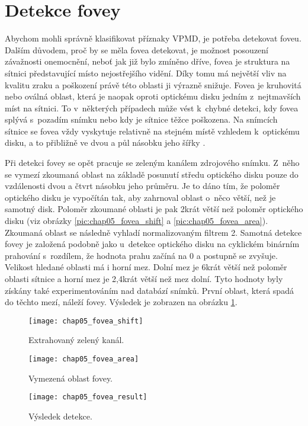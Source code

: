 \section{Detekce fovey}
Abychom mohli správně klasifikovat příznaky VPMD, je potřeba detekovat foveu. Dalším důvodem, proč by se měla fovea detekovat, je možnost posouzení závažnosti onemocnění, neboť jak již bylo zmíněno dříve, fovea je struktura na sítnici představující místo nejostřejšího vidění. Díky tomu má největší vliv na kvalitu zraku a poškození právě této oblasti ji výrazně snižuje. Fovea je kruhovitá nebo oválná oblast, která je naopak oproti optickému disku jedním z~nejtmavších míst na sítnici. To v~některých případech může vést k~chybné detekci, kdy fovea splývá s~pozadím snímku nebo kdy je sítnice těžce poškozena. Na snímcích sítnice se fovea vždy vyskytuje relativně na stejném místě vzhledem k~optickému disku, a to přibližně ve dvou a půl násobku jeho šířky \cite{optic_disc}.

Při detekci fovey se opět pracuje se zeleným kanálem zdrojového snímku. Z~něho se vymezí zkoumaná oblast na základě posunutí středu optického disku pouze do vzdálenosti dvou a čtvrt násobku jeho průměru. Je to dáno tím, že poloměr optického disku je vypočítán tak, aby zahrnoval oblast o~něco větší, než je samotný disk. Poloměr zkoumané oblasti je pak 2krát větší než poloměr optického disku (viz obrázky \ref{pic:chap05_fovea_shift} a \ref{pic:chap05_fovea_area}). Zkoumaná oblast se následně vyhladí normalizovaným filtrem 2. Samotná detekce fovey je založená podobně jako u~detekce optického disku na cyklickém binárním prahování s~rozdílem, že hodnota prahu začíná na 0 a postupně se zvyšuje. Velikost hledané oblasti má i horní mez. Dolní mez je 6krát větší než poloměr oblasti sítnice a horní mez je 2,4krát větší než mez dolní. Tyto hodnoty byly získány také experimentováním nad databází snímků. První oblast, která spadá do těchto mezí, náleží fovey. Výsledek je zobrazen na obrázku \ref{pic:chap05_fovea_result}.

\begin{figure}[h]
  \begin{minipage}[c]{0.315\textwidth}
    \texttt{[image: chap05\_fovea\_shift]}
    \caption{Extrahovaný zelený kanál.}
    \label{pic:chap05_fovea_shift}
  \end{minipage}
  \hfill
  \begin{minipage}[c]{0.315\textwidth}
    \texttt{[image: chap05\_fovea\_area]}
    \caption{Vymezená oblast fovey.}
    \label{pic:chap05_fovea_area}
  \end{minipage}
    \hfill
  \begin{minipage}[c]{0.315\textwidth}
    \texttt{[image: chap05\_fovea\_result]}
    \caption{Výsledek detekce.}
    \label{pic:chap05_fovea_result}
  \end{minipage}
\end{figure}

